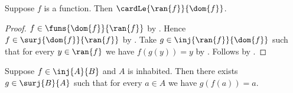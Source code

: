 \begin{proposition}\label{function_range_cardinal_le_domain}
    Suppose $f$ is a function.
    Then $\cardLe{\ran{f}}{\dom{f}}$.
\end{proposition}
\begin{proof}
    $f\in\funs{\dom{f}}{\ran{f}}$ by
        .
    Hence $f\in\surj{\dom{f}}{\ran{f}}$ by .
    Take $g\in\inj{\ran{f}}{\dom{f}}$ such that for every
        $y\in\ran{f}$ we have $f(g(y))=y$ by
        .
    Follows by .
\end{proof}

\begin{theorem}\label{injection_from_inhabited_set_has_surjective_retraction}
    Suppose $f\in\inj{A}{B}$ and $A$ is inhabited.
    Then there exists $g\in\surj{B}{A}$ such that for every $a\in A$
        we have $g(f(a))=a$.
\end{theorem}
